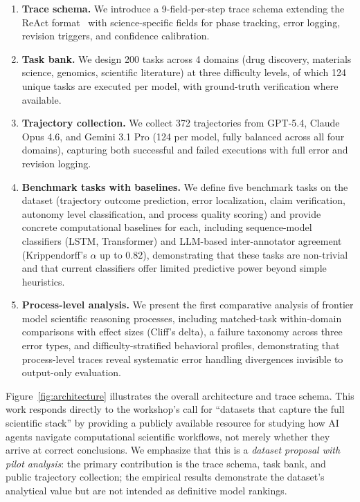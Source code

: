 \documentclass{article}
\newcommand{\ntrajectories}{372\xspace}
\newcommand{\ntasks}{200\xspace}
\newcommand{\nexecuted}{124\xspace}
\newcommand{\ndomains}{4\xspace}
\begin{document}
\begin{enumerate}
    \item \textbf{Trace schema.} We introduce a 9-field-per-step trace schema extending the ReAct format~\citep{yao2023react} with science-specific fields for phase tracking, error logging, revision triggers, and confidence calibration.
    \item \textbf{Task bank.} We design \ntasks tasks across \ndomains domains (drug discovery, materials science, genomics, scientific literature) at three difficulty levels, of which \nexecuted unique tasks are executed per model, with ground-truth verification where available.
    \item \textbf{Trajectory collection.} We collect \ntrajectories trajectories from GPT-5.4, Claude Opus 4.6, and Gemini 3.1 Pro (124 per model, fully balanced across all four domains), capturing both successful and failed executions with full error and revision logging.
    \item \textbf{Benchmark tasks with baselines.} We define five benchmark tasks on the dataset (trajectory outcome prediction, error localization, claim verification, autonomy level classification, and process quality scoring) and provide concrete computational baselines for each, including sequence-model classifiers (LSTM, Transformer) and LLM-based inter-annotator agreement (Krippendorff's $\alpha$ up to 0.82), demonstrating that these tasks are non-trivial and that current classifiers offer limited predictive power beyond simple heuristics.
    \item \textbf{Process-level analysis.} We present the first comparative analysis of frontier model scientific reasoning processes, including matched-task within-domain comparisons with effect sizes (Cliff's delta), a failure taxonomy across three error types, and difficulty-stratified behavioral profiles, demonstrating that process-level traces reveal systematic error handling divergences invisible to output-only evaluation.
\end{enumerate}

Figure~\ref{fig:architecture} illustrates the overall architecture and trace schema.
This work responds directly to the workshop's call for ``datasets that capture the full scientific stack'' by providing a publicly available resource for studying how AI agents navigate computational scientific workflows, not merely whether they arrive at correct conclusions. We emphasize that this is a \emph{dataset proposal with pilot analysis}: the primary contribution is the trace schema, task bank, and public trajectory collection; the empirical results demonstrate the dataset's analytical value but are not intended as definitive model rankings.
\end{document}
